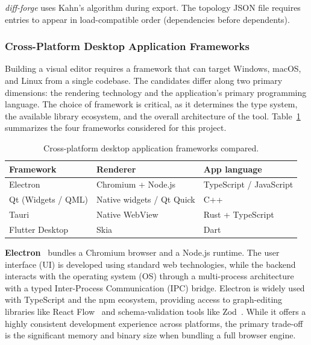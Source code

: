 \textit{diff-forge} uses Kahn's algorithm during export. The topology JSON file requires entries to appear in load-compatible order (dependencies before dependents).

\subsubsection{Cross-Platform Desktop Application Frameworks}
\label{sec:cross-platform-frameworks}
Building a visual editor requires a framework that can target Windows, macOS, and Linux from a single codebase. The candidates differ along two primary dimensions: the rendering technology and the application's primary programming language. The choice of framework is critical, as it determines the type system, the available library ecosystem, and the overall architecture of the tool. Table~\ref{tab:cross-platform} summarizes the four frameworks considered for this project.
\begin{table}[ht]
\centering
\caption[Cross-platform desktop application frameworks compared.]{Cross-platform desktop application frameworks compared.}
\label{tab:cross-platform}
\footnotesize
\begin{tabular}{lll}
\toprule
\textbf{Framework} & \textbf{Renderer} & \textbf{App language} \\
\midrule
Electron        & Chromium + Node.js & TypeScript / JavaScript \\
Qt (Widgets / QML) & Native widgets / Qt Quick & C++ \\
Tauri           & Native WebView     & Rust + TypeScript \\
Flutter Desktop & Skia               & Dart \\
\bottomrule
\end{tabular}
\end{table}

\textbf{Electron}~\cite{electronjs} bundles a Chromium browser and a Node.js runtime. The user interface (UI) is developed using standard web technologies, while the backend interacts with the operating system (OS) through a multi-process architecture with a typed Inter-Process Communication (IPC) bridge. Electron is widely used with TypeScript and the npm ecosystem, providing access to graph-editing libraries like React Flow~\cite{react_flow} and schema-validation tools like Zod~\cite{zod}. While it offers a highly consistent development experience across platforms, the primary trade-off is the significant memory and binary size when bundling a full browser engine.

